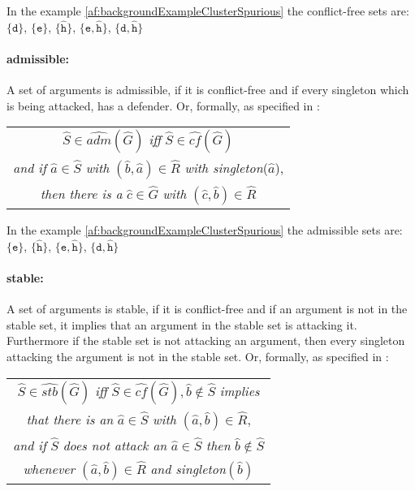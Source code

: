In the example \ref{af:backgroundExampleClusterSpurious} the conflict-free sets are:
$\mathtt{\{d}\}$,
$\mathtt{\{e}\}$,
$\mathtt{\{\hat{h}}\}$,
$\mathtt{\{e, \hat{h}}\}$,
$\mathtt{\{d, \hat{h}}\}$



\paragraph{admissible:} A set of arguments is admissible, if it is conflict-free and if every singleton which is being attacked, has a defender. Or, formally, as specified in \cite{DBLP:conf/kr/SaribaturW21}:

\begin{center}
    \begin{tabular}{c}
        $\hat{S} \in \hat{adm}(\hat{G})$ \textit{iff} $\hat{S} \in \hat{cf}(\hat{G})$\\

        \textit{and if} $\hat{a} \in \hat{S}$ \textit{with} $(\hat{b}, \hat{a}) \in \hat{R}$ \textit{with singleton}($\hat{a}$),\\

        \textit{then there is a} $\hat{c} \in \hat{G}$ \textit{with} $(\hat{c}, \hat{b}) \in \hat{R}$
    \end{tabular}
\end{center}

In the example \ref{af:backgroundExampleClusterSpurious} the admissible sets are:
$\mathtt{\{e}\}$,
$\mathtt{\{\hat{h}}\}$,
$\mathtt{\{e, \hat{h}}\}$,
$\mathtt{\{d, \hat{h}}\}$



\paragraph{stable:} A set of arguments is stable, if it is conflict-free and if an argument is not in the stable set, it implies that an argument in the stable set is attacking it. Furthermore if the stable set is not attacking an argument, then every singleton attacking the argument is not in the stable set. Or, formally, as specified in \cite{DBLP:conf/kr/SaribaturW21}:
\begin{center}
    \begin{tabular}{c}
        $\hat{S} \in \hat{stb}(\hat{G})$ \textit{iff} $\hat{S} \in \hat{cf}(\hat{G}),  \hat{b} \not\in \hat{S}$ \textit{implies}\\

        \textit{that there is an} $\hat{a} \in \hat{S}$ \textit{with} $(\hat{a}, \hat{b}) \in \hat{R}$,\\

        \textit{and if} $\hat{S}$ \textit{does not attack an} $\hat{a} \in \hat{S}$ \textit{then} $\hat{b} \not\in \hat{S}$\\

        \textit{whenever} $(\hat{a}, \hat{b}) \in \hat{R}$ \textit{and singleton}$(\hat{b})$
    \end{tabular}
\end{center}

